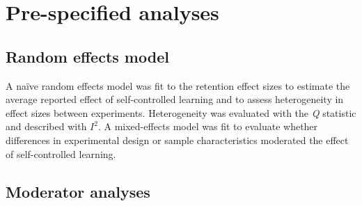 \documentclass[
  english,
  man, donotrepeattitle,floatsintext]{apa7}
\begin{document}
\hypertarget{pre-specified-analyses}{%
\section{Pre-specified analyses}\label{pre-specified-analyses}}

\hypertarget{random-effects-model}{%
\subsection{Random effects model}\label{random-effects-model}}

A naïve random effects model was fit to the retention effect sizes to estimate the average reported effect of self-controlled learning and to assess heterogeneity in effect sizes between experiments. Heterogeneity was evaluated with the \emph{Q} statistic and described with \(I^2\). A mixed-effects model was fit to evaluate whether differences in experimental design or sample characteristics moderated the effect of self-controlled learning.

\hypertarget{moderator-analyses}{%
\subsection{Moderator analyses}\label{moderator-analyses}}
\end{document}
